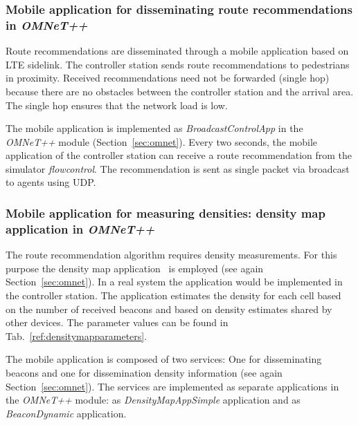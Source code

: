 \subsubsection{Mobile application for disseminating route recommendations in \textit{OMNeT++}}
Route recommendations are disseminated through a mobile application based on LTE sidelink. The controller station sends route recommendations to pedestrians in proximity. Received recommendations need not be forwarded  (single hop) because there are no obstacles  between the controller station and the arrival area. The single hop ensures that the network load is low. 

The mobile application is implemented as \textit{BroadcastControlApp} in the \textit{OMNeT++} module (Section~\ref{sec:omnet}). Every two seconds, the mobile application of the controller station can receive a route recommendation from the simulator \textit{flowcontrol}. The recommendation is sent as single packet via broadcast to  agents using UDP. 








\subsubsection{Mobile application for measuring densities: density map application in \textit{OMNeT++}}
The route recommendation algorithm requires density measurements. For this purpose the density map application~\cite{schuhbaeck-2023-com} is employed (see again Section~\ref{sec:omnet}). In a real system the application would be implemented in the controller station. The application estimates the density for each cell based on the number of received beacons and based on density estimates shared by other devices. The parameter values can be found in Tab.~\ref{ref:densitymapparameters}.

The mobile application is composed of two services: One for disseminating beacons and one for dissemination density information (see again Section~\ref{sec:omnet}). The services are implemented as separate applications in the \textit{OMNeT++} module: as \textit{DensityMapAppSimple} application and as \textit{BeaconDynamic} application.

